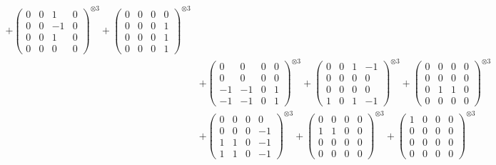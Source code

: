 \documentclass{article}
\begin{document}
{\begin{align}
            + \begin{pmatrix} 0 & 0 & 1 & 0 \\ 0 & 0 & -1 & 0 \\ 0 & 0 & 1 & 0 \\ 0 & 0 & 0 & 0 \end{pmatrix}^{\otimes 3} 
            + \begin{pmatrix} 0 & 0 & 0 & 0 \\ 0 & 0 & 0 & 1 \\ 0 & 0 & 0 & 1 \\ 0 & 0 & 0 & 1 \end{pmatrix}^{\otimes 3} \\
        &+ \label{Rs16-Rc11-Solution-19-c10} \begin{pmatrix} 0 & 0 & 0 & 0 \\ 0 & 0 & 0 & 0 \\ -1 & -1 & 0 & 1 \\ -1 & -1 & 0 & 1 \end{pmatrix}^{\otimes 3} 
            + \begin{pmatrix} 0 & 0 & 1 & -1 \\ 0 & 0 & 0 & 0 \\ 0 & 0 & 0 & 0 \\ 1 & 0 & 1 & -1 \end{pmatrix}^{\otimes 3} 
            + \begin{pmatrix} 0 & 0 & 0 & 0 \\ 0 & 0 & 0 & 0 \\ 0 & 1 & 1 & 0 \\ 0 & 0 & 0 & 0 \end{pmatrix}^{\otimes 3} \\
        &+ \label{Rs16-Rc11-Solution-19-c13} \begin{pmatrix} 0 & 0 & 0 & 0 \\ 0 & 0 & 0 & -1 \\ 1 & 1 & 0 & -1 \\ 1 & 1 & 0 & -1 \end{pmatrix}^{\otimes 3} 
            + \begin{pmatrix} 0 & 0 & 0 & 0 \\ 1 & 1 & 0 & 0 \\ 0 & 0 & 0 & 0 \\ 0 & 0 & 0 & 0 \end{pmatrix}^{\otimes 3} 
            + \begin{pmatrix} 1 & 0 & 0 & 0 \\ 0 & 0 & 0 & 0 \\ 0 & 0 & 0 & 0 \\ 0 & 0 & 0 & 0 \end{pmatrix}^{\otimes 3} \\

\end{align}}
\end{document}
